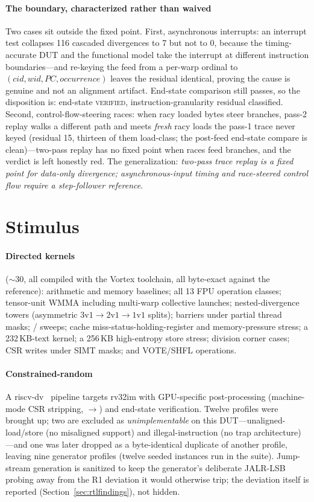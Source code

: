 \documentclass[review,12pt]{elsarticle}
\newcommand{\code}[1]{\texttt{\detokenize{#1}}}
\begin{document}
\paragraph{The boundary, characterized rather than waived}
Two cases sit outside the fixed point. First, asynchronous
interrupts: an interrupt test collapses 116 cascaded divergences to
7 but not to 0, because the timing-accurate DUT and the functional
model take the interrupt at different instruction boundaries---and
re-keying the feed from a per-warp ordinal to
$(\textit{cid},\textit{wid},\textit{PC},\textit{occurrence})$ leaves
the residual identical, proving the cause is genuine and not an
alignment artifact. End-state comparison still passes, so the
disposition is: end-state \textsc{verified}, instruction-granularity
residual classified. Second, control-flow-steering races: when racy
loaded bytes steer branches, pass-2 replay walks a different path and
meets \emph{fresh} racy loads the pass-1 trace never keyed (residual
15, thirteen of them load-class; the post-feed end-state compare is
clean)---two-pass replay has no fixed point when races feed branches,
and the verdict is left honestly red. The generalization:
\emph{two-pass trace replay is a fixed point for data-only
	divergence; asynchronous-input timing and race-steered control flow
	require a step-follower reference}.

\section{Stimulus}
\label{sec:stimulus}
\paragraph{Directed kernels} (${\sim}30$, all compiled with the Vortex
toolchain, all byte-exact against the reference): arithmetic and
memory baselines; all 13 FPU operation classes; tensor-unit WMMA
including multi-warp collective launches; nested-divergence towers
(asymmetric $3\text{v}1 \to 2\text{v}1 \to 1\text{v}1$ splits);
barriers under partial thread masks; \code{wspawn}/\code{tmc}
sweeps; cache miss-status-holding-register and memory-pressure
stress; a 232\,KB-text kernel; a 256\,KB high-entropy store stress;
division corner cases; CSR writes under SIMT masks; and VOTE/SHFL
operations.

\paragraph{Constrained-random} A riscv-dv~\cite{riscvdv} pipeline
targets rv32im with GPU-specific post-processing (machine-mode CSR
stripping, \code{ecall}$\to$\code{ebreak}) and end-state
verification. Twelve profiles were brought up; two are excluded as
\emph{unimplementable} on this DUT---unaligned-load/store (no
misaligned support) and illegal-instruction (no trap
architecture)---and one was later dropped as a byte-identical
duplicate of another profile, leaving nine generator profiles (twelve
seeded instances run in the suite). Jump-stream generation is
sanitized to keep the generator's deliberate JALR-LSB probing away
from the R1 deviation it would otherwise trip; the deviation itself
is reported (Section~\ref{sec:rtlfindings}), not hidden.
\end{document}
